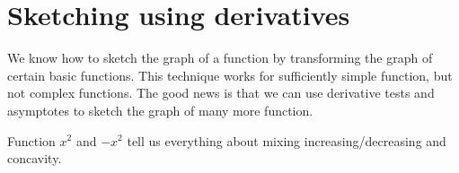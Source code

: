\documentclass[../main.tex]{subfiles}
\begin{document}
%
%
%
% 

\section{Sketching using derivatives}
  We know how to sketch the graph of a function by transforming the graph of certain basic functions.  This technique works for sufficiently simple function, but not complex functions. The good news is that we can use derivative tests and asymptotes to sketch the graph of many more function.

  Function \(x^{2}\) and \(-x^{2}\) tell us everything about mixing increasing/decreasing and concavity.

  \begin{center}
    
    \qquad
    
  \end{center}
\end{document}
